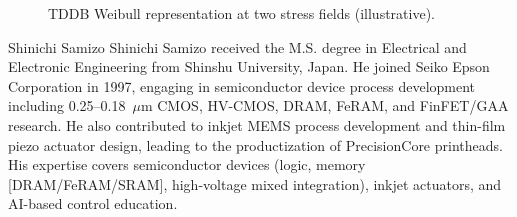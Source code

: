 \documentclass[conference]{IEEEtran}
\begin{document}
\begin{figure}[!t]
\centering
{}
\caption{TDDB Weibull representation at two stress fields (illustrative).}
\label{fig:tddb}
\end{figure}

\begin{IEEEbiographynophoto}{Shinichi Samizo}
Shinichi Samizo received the M.S. degree in Electrical and Electronic Engineering from Shinshu University, Japan. He joined Seiko Epson Corporation in 1997, engaging in semiconductor device process development including 0.25--0.18~$\mu$m CMOS, HV-CMOS, DRAM, FeRAM, and FinFET/GAA research. He also contributed to inkjet MEMS process development and thin-film piezo actuator design, leading to the productization of PrecisionCore printheads. His expertise covers semiconductor devices (logic, memory [DRAM/FeRAM/SRAM], high-voltage mixed integration), inkjet actuators, and AI-based control education.
\end{IEEEbiographynophoto}
\end{document}
